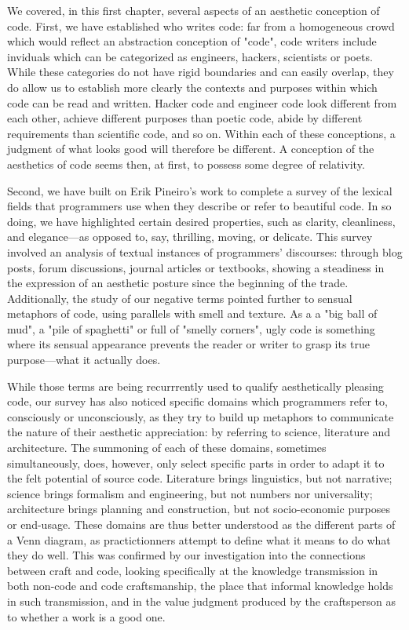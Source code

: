 We covered, in this first chapter, several aspects of an aesthetic conception of code. First, we have established who writes code: far from a homogeneous crowd which would reflect an abstraction conception of "code", code writers include inviduals which can be categorized as engineers, hackers, scientists or poets. While these categories do not have rigid boundaries and can easily overlap, they do allow us to establish more clearly the contexts and purposes within which code can be read and written. Hacker code and engineer code look different from each other, achieve different purposes than poetic code, abide by different requirements than scientific code, and so on. Within each of these conceptions, a judgment of what looks good will therefore be different. A conception of the aesthetics of code seems then, at first, to possess some degree of relativity.

Second, we have built on Erik Pineiro's work to complete a survey of the lexical fields that programmers use when they describe or refer to beautiful code. In so doing, we have highlighted certain desired properties, such as clarity, cleanliness, and elegance—as opposed to, say, thrilling, moving, or delicate. This survey involved an analysis of textual instances of programmers' discourses: through blog posts, forum discussions, journal articles or textbooks, showing a steadiness in the expression of an aesthetic posture since the beginning of the trade. Additionally, the study of our negative terms pointed further to sensual metaphors of code, using parallels with smell and texture. As a a "big ball of mud", a "pile of spaghetti" or full of "smelly corners", ugly code is something where its sensual appearance prevents the reader or writer to grasp its true purpose—what it actually does.

While those terms are being recurrrently used to qualify aesthetically pleasing code, our survey has also noticed specific domains which programmers refer to, consciously or unconsciously, as they try to build up metaphors to communicate the nature of their aesthetic appreciation: by referring to science, literature and architecture. The summoning of each of these domains, sometimes simultaneously, does, however, only select specific parts in order to adapt it to the felt potential of source code. Literature brings linguistics, but not narrative; science brings formalism and engineering, but not numbers nor universality; architecture brings planning and construction, but not socio-economic purposes or end-usage. These domains are thus better understood as the different parts of a Venn diagram, as practictionners attempt to define what it means to do what they do well. This was confirmed by our investigation into the connections between craft and code, looking specifically at the knowledge transmission in both non-code and code craftsmanship, the place that informal knowledge holds in such transmission, and in the value judgment produced by the craftsperson as to whether a work is a good one.

